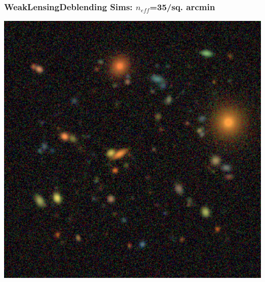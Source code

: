 \documentclass{beamer}
\newcommand{\neff}{$n_{eff}$}
\begin{document}
\begin{frame}
    \frametitle{WeakLensingDeblending Sims: \neff=35/sq. arcmin}
 
    \begin{center}
        \includegraphics[height=0.8\textheight]{descwl-example1.png}
    \end{center}

\end{frame}
\end{document}

